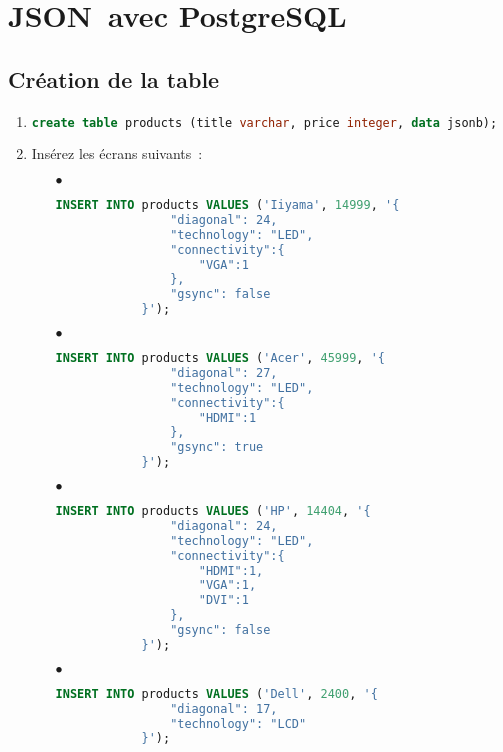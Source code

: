 \documentclass[a4paper,10pt]{article}
\begin{document}
\section{JSON avec PostgreSQL}

  \subsection{Création de la table}
    \begin{enumerate}
      \item
      \begin{lstlisting}[language=SQL, gobble=6, tabsize=2]
      create table products (title varchar, price integer, data jsonb);
      \end{lstlisting}
      \item Insérez les écrans suivants :
          \begin{itemize}
            \item[$\bullet$]
            \begin{lstlisting}[language=SQL, gobble=12, tabsize=2, showstringspaces=false]
            INSERT INTO products VALUES ('Iiyama', 14999, '{
                "diagonal": 24,
                "technology": "LED",
                "connectivity":{
                    "VGA":1
                },
                "gsync": false
            }');
            \end{lstlisting}
            \item[$\bullet$]
            \begin{lstlisting}[language=SQL, gobble=12, tabsize=2, showstringspaces=false]
            INSERT INTO products VALUES ('Acer', 45999, '{
                "diagonal": 27,
                "technology": "LED",
                "connectivity":{
                    "HDMI":1
                },
                "gsync": true
            }');
            \end{lstlisting}
            \item[$\bullet$]
            \begin{lstlisting}[language=SQL, gobble=12, tabsize=2, showstringspaces=false]
            INSERT INTO products VALUES ('HP', 14404, '{
                "diagonal": 24,
                "technology": "LED",
                "connectivity":{
                    "HDMI":1,
                    "VGA":1,
                    "DVI":1
                },
                "gsync": false
            }');
            \end{lstlisting}
            \item[$\bullet$]
            \begin{lstlisting}[language=SQL, gobble=12, tabsize=2, showstringspaces=false]
            INSERT INTO products VALUES ('Dell', 2400, '{
                "diagonal": 17,
                "technology": "LCD"
            }');
            \end{lstlisting}
         \end{itemize}
    \end{enumerate}
\end{document}

